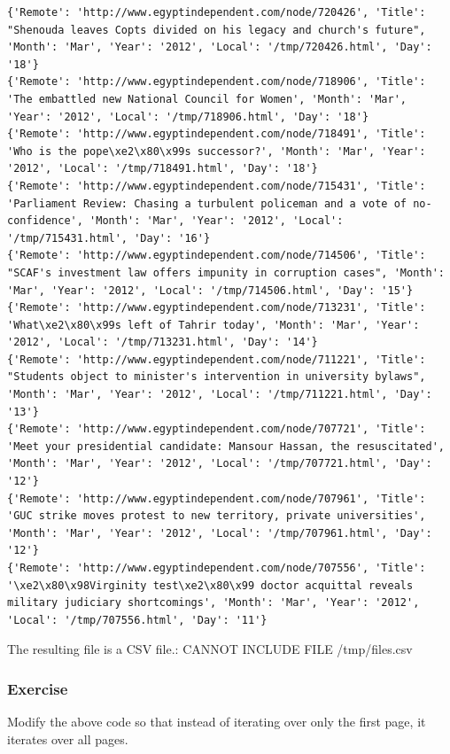 \documentclass[11pt]{article}
\begin{document}
\begin{verbatim}
{'Remote': 'http://www.egyptindependent.com/node/720426', 'Title': "Shenouda leaves Copts divided on his legacy and church's future", 'Month': 'Mar', 'Year': '2012', 'Local': '/tmp/720426.html', 'Day': '18'}
{'Remote': 'http://www.egyptindependent.com/node/718906', 'Title': 'The embattled new National Council for Women', 'Month': 'Mar', 'Year': '2012', 'Local': '/tmp/718906.html', 'Day': '18'}
{'Remote': 'http://www.egyptindependent.com/node/718491', 'Title': 'Who is the pope\xe2\x80\x99s successor?', 'Month': 'Mar', 'Year': '2012', 'Local': '/tmp/718491.html', 'Day': '18'}
{'Remote': 'http://www.egyptindependent.com/node/715431', 'Title': 'Parliament Review: Chasing a turbulent policeman and a vote of no-confidence', 'Month': 'Mar', 'Year': '2012', 'Local': '/tmp/715431.html', 'Day': '16'}
{'Remote': 'http://www.egyptindependent.com/node/714506', 'Title': "SCAF's investment law offers impunity in corruption cases", 'Month': 'Mar', 'Year': '2012', 'Local': '/tmp/714506.html', 'Day': '15'}
{'Remote': 'http://www.egyptindependent.com/node/713231', 'Title': 'What\xe2\x80\x99s left of Tahrir today', 'Month': 'Mar', 'Year': '2012', 'Local': '/tmp/713231.html', 'Day': '14'}
{'Remote': 'http://www.egyptindependent.com/node/711221', 'Title': "Students object to minister's intervention in university bylaws", 'Month': 'Mar', 'Year': '2012', 'Local': '/tmp/711221.html', 'Day': '13'}
{'Remote': 'http://www.egyptindependent.com/node/707721', 'Title': 'Meet your presidential candidate: Mansour Hassan, the resuscitated', 'Month': 'Mar', 'Year': '2012', 'Local': '/tmp/707721.html', 'Day': '12'}
{'Remote': 'http://www.egyptindependent.com/node/707961', 'Title': 'GUC strike moves protest to new territory, private universities', 'Month': 'Mar', 'Year': '2012', 'Local': '/tmp/707961.html', 'Day': '12'}
{'Remote': 'http://www.egyptindependent.com/node/707556', 'Title': '\xe2\x80\x98Virginity test\xe2\x80\x99 doctor acquittal reveals military judiciary shortcomings', 'Month': 'Mar', 'Year': '2012', 'Local': '/tmp/707556.html', 'Day': '11'}
\end{verbatim}

The resulting file is a CSV file.:
CANNOT INCLUDE FILE /tmp/files.csv
\subsubsection{Exercise}
\label{sec-5-3-4}


Modify the above code so that instead of iterating over only the first page, it iterates over all pages.
\end{document}
